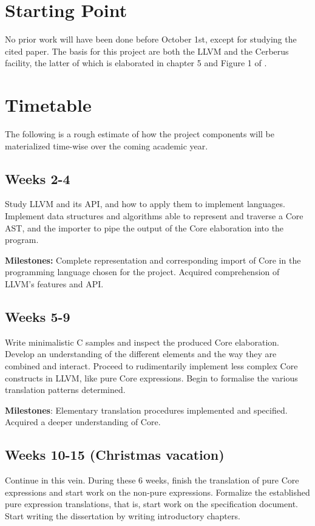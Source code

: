 \documentclass[12pt]{article}
\begin{document}
\section{Starting Point}
No prior work will have been done before October 1st, except for studying the cited paper. The basis for this project are both the LLVM and the Cerberus facility, the latter of which is elaborated in chapter 5 and Figure 1 of \cite{1}. 

\section{Timetable}
The following is a rough estimate of how the project components will be materialized time-wise over the coming academic year. 

\subsection{Weeks 2-4}
Study LLVM and its API, and how to apply them to implement languages. Implement data structures and algorithms able to represent and traverse a Core AST, and the importer to pipe the output of the Core elaboration into the program.

\textbf{Milestones:} Complete representation and corresponding import of Core in the programming language chosen for the project. Acquired comprehension of LLVM's features and API.

\subsection{Weeks 5-9} 

Write minimalistic C samples and inspect the produced Core elaboration. Develop an understanding of the different elements and the way they are combined and interact. Proceed to rudimentarily implement less complex Core constructs in LLVM, like pure Core expressions. Begin to formalise the various translation patterns determined. 	
  
\textbf{Milestones}: Elementary translation procedures implemented and specified. Acquired a deeper understanding of Core. 

\subsection{Weeks 10-15 (Christmas vacation)}
Continue in this vein. During these 6 weeks, finish the translation of pure Core expressions and start work on the non-pure expressions. Formalize the established pure expression translations, that is, start work on the specification document. Start writing the dissertation by writing introductory chapters.
\end{document}
